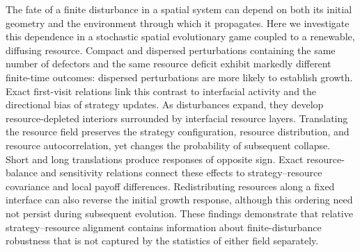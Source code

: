 The fate of a finite disturbance in a spatial system can depend on both its initial geometry and the environment through which it propagates. Here we investigate this dependence in a stochastic spatial evolutionary game coupled to a renewable, diffusing resource. Compact and dispersed perturbations containing the same number of defectors and the same resource deficit exhibit markedly different finite-time outcomes: dispersed perturbations are more likely to establish growth. Exact first-visit relations link this contrast to interfacial activity and the directional bias of strategy updates. As disturbances expand, they develop resource-depleted interiors surrounded by interfacial resource layers. Translating the resource field preserves the strategy configuration, resource distribution, and resource autocorrelation, yet changes the probability of subsequent collapse. Short and long translations produce responses of opposite sign. Exact resource-balance and sensitivity relations connect these effects to strategy--resource covariance and local payoff differences. Redistributing resources along a fixed interface can also reverse the initial growth response, although this ordering need not persist during subsequent evolution. These findings demonstrate that relative strategy--resource alignment contains information about finite-disturbance robustness that is not captured by the statistics of either field separately.
